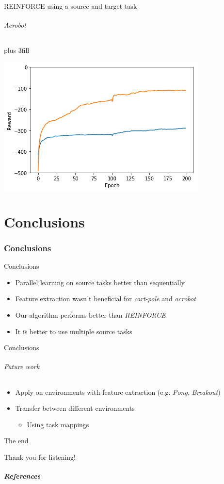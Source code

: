 \begin{frame}[fragile]{REINFORCE using a source and target task}
\framesubtitle{Acrobot}
\vskip0pt plus 3fill
\begin{center}
    \includegraphics[width=.8\linewidth]{results/Acrobot/reinforce_2tasks.png}
\end{center}
\end{frame}

\part{Conclusions}
\section{Conclusions}
\begin{frame}[fragile]{Conclusions}
\begin{itemize}
    \item Parallel learning on source tasks better than sequentially
    \item Feature extraction wasn't beneficial for \textit{cart-pole} and \textit{acrobot}
    \item Our algorithm performs better than \textit{REINFORCE}
    \item It is better to use multiple source tasks
\end{itemize}
\end{frame}


\begin{frame}[fragile]{Conclusions}
\framesubtitle{Future work}
\begin{itemize}
    \item Apply on environments with feature extraction (e.g. \textit{Pong}, \textit{Breakout})
    \item Transfer between different environments
    \begin{itemize}
        \item Using task mappings
    \end{itemize}
\end{itemize}
\end{frame}

\begin{frame}[c]{The end}
\begin{center}
    \color{vubbleu} \LARGE\vubfont Thank you for listening!
\end{center}
\end{frame}

\begin{frame}[allowframebreaks]
\frametitle{References}
\footnotesize{


}
\end{frame}


